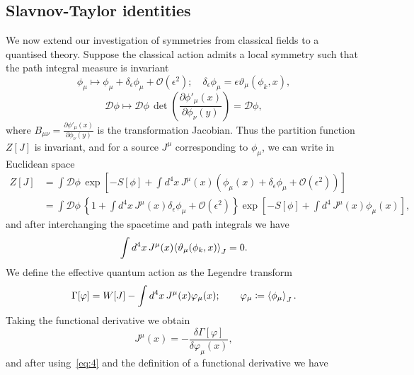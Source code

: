 \documentclass[11pt, a4paper]{article}
\begin{document}
\subsection{Slavnov-Taylor identities}
We now extend our investigation of symmetries from classical fields to a
quantised theory. Suppose the classical action admits a local symmetry
such that the path integral measure is invariant
\begin{equation}
  \phi_\mu \mapsto \phi_\mu + \delta_\epsilon\phi_\mu +
  \mathcal{O}(\epsilon^2); \quad \delta_\epsilon\phi_\mu = \epsilon\vartheta_\mu(\phi_k, x),
\end{equation}
\begin{equation}
  \mathcal{D}\phi \mapsto
  \mathcal{D}\phi\,\det\!{\left(\frac{\partial \phi'_{\mu}(x)}{\partial \phi_\nu(y)}\right)}
  = \mathcal{D}\phi,
\end{equation}
where $B_{\mu\nu} = \frac{\partial \phi'_{\mu}(x)}{\partial \phi_\nu(y)}$ is the 
transformation Jacobian. Thus the partition function $Z[J]$ is invariant,
and for a source $J^\mu$ corresponding to $\phi_\mu$, 
we can write in Euclidean space 
\begin{equation}
  \begin{split}
  Z[J] & = \int{\mathcal{D}\phi\,\exp{\left[-S[\phi]
    + \int{d^4x\, J^\mu(x)(\phi_\mu(x) + \delta_\epsilon\phi_\mu
    +\mathcal{O}(\epsilon^2) )}\right]} } \\
  & = \int{\mathcal{D}\phi\,\left\{ 1 + \int{d^4x\,J^\mu(x)\delta_\epsilon\phi_\mu
    + \mathcal{O}(\epsilon^2)} \right\}
  \exp{\left[-S[\phi] + \int{d^4\,J^\mu(x)\phi_\mu(x)}\right]} },
    \end{split}
\end{equation}
and after interchanging the spacetime and path integrals we have
\begin{equation}\label{eq:4}
  \int{d^4x\,J^\mu(x)\!\braket{\vartheta_\mu(\phi_k, x)}}_J = 0.
\end{equation}
We define the effective quantum action as the Legendre transform
\begin{equation}
  \Gamma[\varphi] = W[J] - \int{d^4x\,J^\mu(x)\varphi_\mu(x)}; \quad 
  \quad \varphi_\mu \coloneq \braket{\phi_\mu}_J.
\end{equation}
Taking the functional derivative we obtain
\begin{equation}
  J^\mu(x) = - \frac{\delta \Gamma[\varphi]}{\delta \varphi_\mu(x)},
\end{equation}
and after using~\eqref{eq:4} and the definition
of a functional derivative we have
\end{document}
